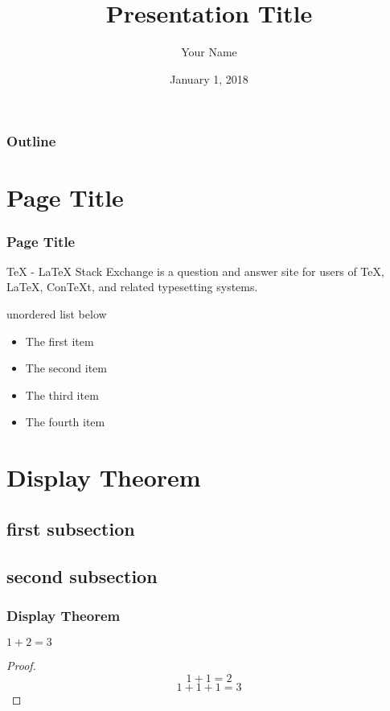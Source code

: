 \documentclass[aspectratio=169]{beamer}
\author{Your Name}
\title{Presentation Title}
\date{January 1, 2018}
\begin{document}
\frame[plain]{\titlepage}

\begin{frame}
\frametitle{Outline}
\tableofcontents
\end{frame}

\section{Page Title}


\begin{frame}
\frametitle{Page Title}

TeX - LaTeX Stack Exchange is a question and answer site for users of TeX, LaTeX, ConTeXt, and related typesetting systems.

\vspace{0.4cm}

unordered list below

\begin{itemize}
\item The first item
\item The second item
\item The third item
\item The fourth item
\end{itemize}

\end{frame}

\section{Display Theorem}


\subsection{first subsection}

\subsection{second subsection}

\begin{frame}
  \frametitle{Display Theorem}
  \begin{theorem}
    $1 + 2 = 3$
  \end{theorem}
  \begin{proof}
    $$1 + 1 = 2$$
    $$1 + 1 + 1 = 3$$
  \end{proof}
\end{frame}
\end{document}
